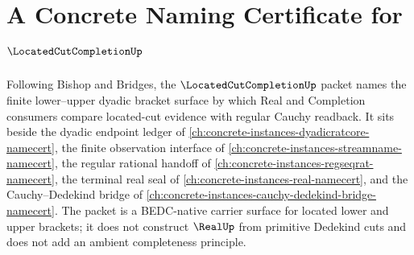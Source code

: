 \chapter{A Concrete Naming Certificate for $\LocatedCutCompletionUp$}
\label{ch:concrete-instances-located-cut-completion-namecert}

Following Bishop and Bridges, the $\LocatedCutCompletionUp$ packet names the finite lower--upper dyadic bracket surface by which Real and Completion consumers compare located-cut evidence with regular Cauchy readback. It sits beside the dyadic endpoint ledger of \autoref{ch:concrete-instances-dyadicratcore-namecert}, the finite observation interface of \autoref{ch:concrete-instances-streamname-namecert}, the regular rational handoff of \autoref{ch:concrete-instances-regseqrat-namecert}, the terminal real seal of \autoref{ch:concrete-instances-real-namecert}, and the Cauchy--Dedekind bridge of \autoref{ch:concrete-instances-cauchy-dedekind-bridge-namecert}. The packet is a BEDC-native carrier surface for located lower and upper brackets; it does not construct $\RealUp$ from primitive Dedekind cuts and does not add an ambient completeness principle.

